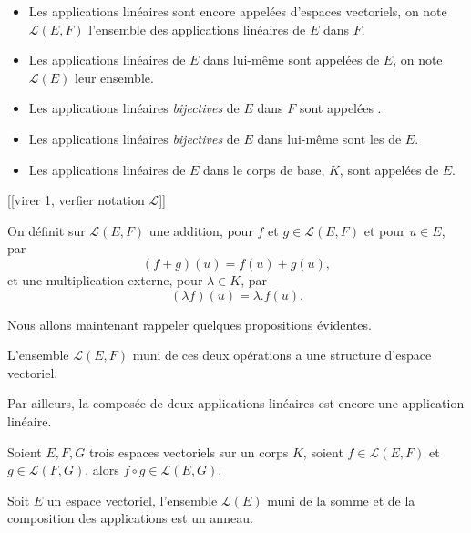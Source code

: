 \documentclass[class=report,crop=false]{standalone}
\begin{document}
\begin{definition}
\begin{itemize}
  \item Les applications linéaires sont encore appelées  
  d'espaces vectoriels, on note $\mathcal{L}(E,F)$ 
  l'ensemble des applications linéaires de $E$ dans $F$.
  
  \item Les applications linéaires de $E$ dans lui-même sont appelées 
   de $E$, on note $\mathcal{L}(E)$ leur ensemble.
 
  \item Les applications linéaires \emph{bijectives} de $E$ dans $F$ sont appelées .
 
  \item Les applications linéaires \emph{bijectives} de $E$ dans lui-même sont les  de $E$.

  \item Les applications linéaires de $E$ dans le corps de base, $K$, sont appelées  de $E$.
\end{itemize}
  
\end{definition}

[[virer 1, verfier notation $\mathcal{L}$]]

On définit sur $\mathcal{L}(E,F)$ une addition, pour $f$ et $g\in\mathcal{L}(E,F)$ et pour $u\in E$, par
$$(f+g)(u)=f(u)+g(u),$$
et une multiplication externe, pour $\lambda\in K$, par
$$(\lambda f)(u)=\lambda.f(u).$$



Nous allons maintenant rappeler quelques propositions évidentes.

\begin{proposition}
L'ensemble $\mathcal{L}(E,F)$ muni de ces deux opérations a une structure d'espace vectoriel.
\end{proposition} 

Par ailleurs, la composée de deux applications linéaires est encore une application linéaire.

\begin{proposition}
Soient $E,F,G$ trois espaces vectoriels sur un corps $K$, soient 
$f\in \mathcal{L}(E,F)$ et $g\in \mathcal{L}(F,G)$, alors $f\circ g\in\mathcal{L}(E,G)$.
\end{proposition} 


\begin{proposition}
Soit $E$ un espace vectoriel, l'ensemble $\mathcal{L}(E)$ muni de la somme et de 
la composition des applications est un anneau.
\end{proposition}
\end{document}
